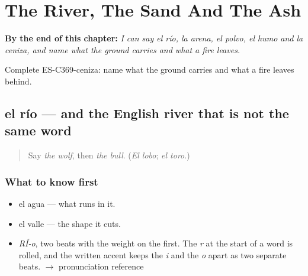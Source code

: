 
\chapter{The River, The Sand And The Ash}
\label{ch:el-rio-y-la-arena}

\begin{chapteropening}
\textbf{By the end of this chapter:} \emph{I can say el río, la arena, el polvo, el humo and la ceniza, and name what the ground carries and what a fire leaves.}

Complete ES-C369-ceniza: name what the ground carries and what a fire leaves behind.
\end{chapteropening}

\section[el río]{el río — and the English river that is not the same word}

\label{lesson:ES-C369-rio}



\begin{quote}
Say \emph{the wolf}, then \emph{the bull}. (\emph{El lobo}; \emph{el toro}.)
\end{quote}

\subsection*{What to know first}
\begin{itemize}
\raggedright
  \item el agua — what runs in it.
  \item el valle — the shape it cuts.
\end{itemize}

\begin{sounds}
\begin{itemize}
\raggedright
  \item \emph{RÍ-o}, two beats with the weight on the first. The \emph{r} at the start of a word is rolled, and the written accent keeps the \emph{i} and the \emph{o} apart as two separate beats. $\to$ pronunciation reference
\end{itemize}
\end{sounds}

